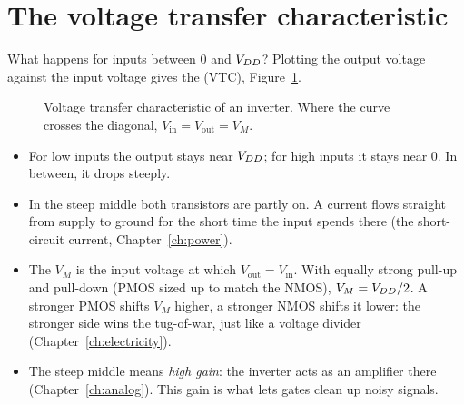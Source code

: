 \section{The voltage transfer characteristic}

What happens for inputs between 0 and $V_{DD}$? Plotting the output voltage against the input voltage gives the  (VTC), Figure~\ref{fig:vtc}.

\begin{figure}[h]
\centering
{}
\caption{Voltage transfer characteristic of an inverter. Where the curve crosses the diagonal, $V_{\text{in}} = V_{\text{out}} = V_M$.}
\label{fig:vtc}
\end{figure}

\begin{itemize}
  \item For low inputs the output stays near $V_{DD}$; for high inputs it stays near 0. In between, it drops steeply.
  \item In the steep middle both transistors are partly on. A current flows straight from supply to ground for the short time the input spends there (the short-circuit current, Chapter~\ref{ch:power}).
  \item The  $V_M$ is the input voltage at which $V_{\text{out}} = V_{\text{in}}$. With equally strong pull-up and pull-down (PMOS sized up to match the NMOS), $V_M = V_{DD}/2$. A stronger PMOS shifts $V_M$ higher, a stronger NMOS shifts it lower: the stronger side wins the tug-of-war, just like a voltage divider (Chapter~\ref{ch:electricity}).
  \item The steep middle means \emph{high gain}: the inverter acts as an amplifier there (Chapter~\ref{ch:analog}). This gain is what lets gates clean up noisy signals.
\end{itemize}

